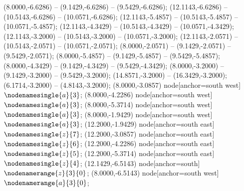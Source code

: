    (8.0000,-6.6286) -- (9.1429,-6.6286) -- (9.5429,-6.6286);
   (12.1143,-6.6286) -- (10.5143,-6.6286) -- (10.0571,-6.6286);
   (12.1143,-5.4857) -- (10.5143,-5.4857) -- (10.0571,-5.4857);
   (12.1143,-4.3429) -- (10.5143,-4.3429) -- (10.0571,-4.3429);
   (12.1143,-3.2000) -- (10.5143,-3.2000) -- (10.0571,-3.2000);
   (12.1143,-2.0571) -- (10.5143,-2.0571) -- (10.0571,-2.0571);
   (8.0000,-2.0571) -- (9.1429,-2.0571) -- (9.5429,-2.0571);
   (8.0000,-5.4857) -- (9.1429,-5.4857) -- (9.5429,-5.4857);
   (8.0000,-4.3429) -- (9.1429,-4.3429) -- (9.5429,-4.3429);
   (8.0000,-3.2000) -- (9.1429,-3.2000) -- (9.5429,-3.2000);
   (14.8571,-3.2000) -- (16.3429,-3.2000);
   (6.1714,-3.2000) -- (4.8143,-3.2000);
   (8.0000,-3.0857) node[anchor=south west] {$\nodenamesingle{a}{3}$};
   (8.0000,-4.2286) node[anchor=south west] {$\nodenamesingle{a}{3}$};
   (8.0000,-5.3714) node[anchor=south west] {$\nodenamesingle{a}{3}$};
   (8.0000,-1.9429) node[anchor=south west] {$\nodenamesingle{a}{3}$};
   (12.2000,-1.9429) node[anchor=south east] {$\nodenamesingle{z}{7}$};
   (12.2000,-3.0857) node[anchor=south east] {$\nodenamesingle{z}{6}$};
   (12.2000,-4.2286) node[anchor=south east] {$\nodenamesingle{z}{5}$};
   (12.2000,-5.3714) node[anchor=south east] {$\nodenamesingle{z}{4}$};
   (12.1429,-6.5143) node[anchor=south] {$\nodenamerange{z}{3}{0}$};
   (8.0000,-6.5143) node[anchor=south west] {$\nodenamerange{a}{3}{0}$};
